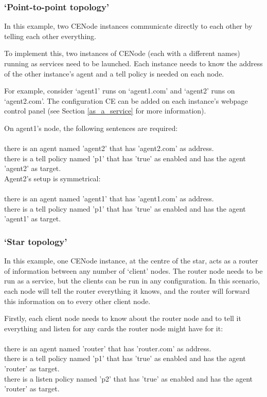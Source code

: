 \documentclass{scrartcl}
\newcommand{\ce}[1]{\textsf{#1}}
\begin{document}
\subsubsection{`Point-to-point topology'}
In this example, two CENode instances communicate directly to each other by telling each other everything.

To implement this, two instances of CENode (each with a different names) running as services need to be launched. Each instance needs to know the address of the other instance's agent and a tell policy is needed on each node.

For example, consider `agent1' runs on `agent1.com' and `agent2' runs on `agent2.com'. The configuration CE can be added on each instance's webpage control panel (see Section \ref{as_a_service} for more information).

On agent1's node, the following sentences are required:\\
\\\ce{there is an agent named 'agent2' that has 'agent2.com' as address.\\
there is a tell policy named 'p1' that has 'true' as enabled and has the agent 'agent2' as target.}\\

Agent2's setup is symmetrical:\\
\\\ce{there is an agent named 'agent1' that has 'agent1.com' as address.\\
there is a tell policy named 'p1' that has 'true' as enabled and has the agent 'agent1' as target.}\\


\subsubsection{`Star topology'}
In this example, one CENode instance, at the centre of the star, acts as a router of information between any number of `client' nodes. The router node needs to be run as a service, but the clients can be run in any configuration. In this scenario, each node will tell the router everything it knows, and the router will forward this information on to every other client node.

Firstly, each client node needs to know about the router node and to tell it everything and listen for any cards the router node might have for it:\\
\\\ce{there is an agent named 'router' that has 'router.com' as address.\\
there is a tell policy named 'p1' that has 'true' as enabled and has the agent 'router' as target.\\
there is a listen policy named 'p2'  that has 'true' as enabled and has the agent 'router' as target.}\\
\end{document}
